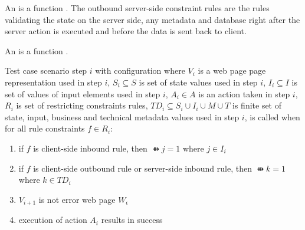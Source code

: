 \begin{defi}
An  is a function . The outbound server-side constraint rules are the rules validating the state on the server side, any metadata and database right after the server action is executed and before the data is sent back to client.
\cite{conf/fedcsis/FrajtakBJ12}
\end{defi}

\begin{defi}
An  is a function .
\cite{conf/fedcsis/FrajtakBJ12}
\end{defi}

\begin{defi}
Test case scenario step $i$ with configuration  where $V_i$ is a web page page representation used in step $i$, $S_i\subseteq S$ is set of state values used in step $i$, $I_i\subseteq I$ is set of values of input elements used in step $i$, $A_i\in A$ is an action taken in step $i$, $R_i$ is set of restricting constraints rules, $TD_i\subseteq S_i\cup I_i\cup M\cup T$ is finite set of state, input, business and technical metadata values used in step $i$, is called  when for all rule constraints $f \in R_i$:
\begin{enumerate}
 \item if $f$ is client-side inbound rule, then $\ffun{j}=1$ where $j\in I_i$
 \item if $f$ is client-side outbound rule or server-side inbound rule, then $\ffun{k}=1$ where $k \in TD_i$
 \item $V_{i+1}$ is not error web page $W_{\epsilon}$
 \item execution of action $A_i$ results in success
\end{enumerate}
\cite{conf/fedcsis/FrajtakBJ12}
\end{defi}

